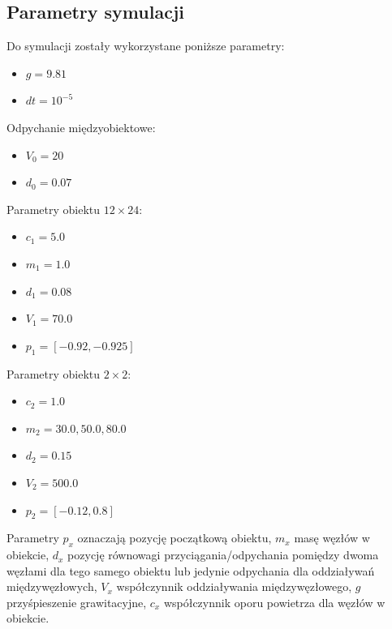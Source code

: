 \documentclass[12pt, letterpaper]{report}
\begin{document}
    \subsection{Parametry symulacji}
    Do symulacji zostały wykorzystane poniższe parametry:
    \begin{multicols*}{2}
        \begin{itemize}
            \item $g = 9.81$
            \item $dt = 10^{-5}$
        \end{itemize}
        Odpychanie międzyobiektowe:
        \begin{itemize}
            \item $V_{0} = 20$
            \item $d_{0} = 0.07$
        \end{itemize}
        Parametry obiektu $12 \times 24$:
        \begin{itemize}
            \item $c_{1} = 5.0$
            \item $m_{1} = 1.0$
            \item $d_{1} = 0.08$
            \item $V_{1} = 70.0$
            \item $p_{1} = [-0.92, -0.925]$
        \end{itemize}
        Parametry obiektu $2 \times 2$:
        \begin{itemize}
            \item $c_{2} = 1.0$
            \item $m_{2} = 30.0, 50.0, 80.0$
            \item $d_{2} = 0.15$
            \item $V_{2} = 500.0$
            \item $p_{2} = [-0.12, 0.8]$
        \end{itemize}
    \end{multicols*}

    Parametry $p_x$ oznaczają pozycję początkową obiektu, $m_x$ masę węzłów w obiekcie, 
    $d_x$ pozycję równowagi przyciągania/odpychania pomiędzy dwoma węzłami dla tego
    samego obiektu lub jedynie odpychania dla oddziaływań międzywęzłowych,
    $V_x$ współczynnik oddziaływania międzywęzłowego, $g$ przyśpieszenie grawitacyjne, 
    $c_x$ współczynnik oporu powietrza dla węzłów w obiekcie.
\end{document}

